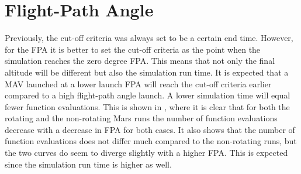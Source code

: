 \section{Flight-Path Angle}
\label{sec:flightPathAngle}
Previously, the cut-off criteria was always set to be a certain end time. However, for the \ac{FPA} it is better to set the cut-off criteria as the point when the simulation reaches the zero degree \ac{FPA}. This means that not only the final altitude will be different but also the simulation run time. It is expected that a \ac{MAV} launched at a lower launch \ac{FPA} will reach the cut-off criteria earlier compared to a high flight-path angle launch. A lower simulation time will equal fewer function evaluations. This is shown in , where it is clear that for both the rotating and the non-rotating Mars runs the number of function evaluations decrease with a decrease in \ac{FPA} for both cases. It also shows that the number of function evaluations does not differ much compared to the non-rotating runs, but the two curves do seem to diverge slightly with a higher \ac{FPA}. This is expected since the simulation run time is higher as well.  





%




